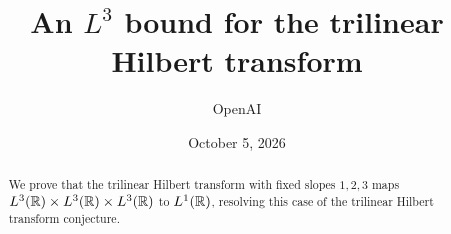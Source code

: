 \documentclass[11pt,reqno]{amsart}
\title[The trilinear Hilbert transform on three $L^3$ inputs]{An $L^3$ bound for the trilinear Hilbert transform}
\author{OpenAI}
\date{October 5, 2026}
\begin{document}
\begin{abstract}
We prove that the trilinear Hilbert transform with fixed slopes $1,2,3$ maps
$L^3(\mathbb R)\times L^3(\mathbb R)\times L^3(\mathbb R)$ to $L^1(\mathbb R)$, resolving this case of
the trilinear Hilbert transform conjecture.
\end{abstract}
\maketitle
\tableofcontents












\end{document}
